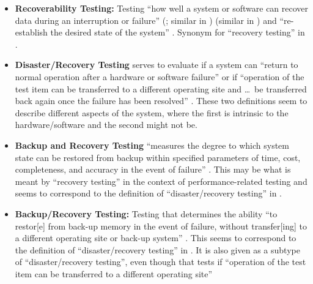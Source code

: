 \begin{itemize}
    \item \textbf{Recoverability Testing:} Testing ``how well a system or
          software can recover data during an interruption or failure''
          \ifnotpaper
              (\citealp[p.~7-10]{SWEBOK2024}; similar in \citealp{ISO_IEC2023a})
          \else
              \cite[p.~7-10]{SWEBOK2024} (similar in \cite{ISO_IEC2023a})
          \fi
          and ``re-establish the desired state of the system'' \citep{ISO_IEC2023a}.
          Synonym for ``recovery testing'' in \citet[p.~47]{Kam2008}.
    \item \textbf{Disaster/Recovery Testing} serves to evaluate if a system
          can ``return to normal operation after a hardware
          or software failure'' \citep[p.~140]{IEEE2017} or if ``operation of
          the test item can be transferred to a different operating site and
          \dots\ be transferred back again once the failure has been
          resolved'' \citeyearpar[p.~37]{IEEE2021}. These two definitions seem to
          describe different aspects of the system, where the first is
          intrinsic to the hardware/software and the second might not be.
    \item \textbf{Backup and Recovery Testing} ``measures the
          degree to which system state can be restored from backup within
          specified parameters of time, cost, completeness, and accuracy in
          the event of failure'' \citep[p.~2]{IEEE2013}. This may be what is
          meant by ``recovery testing'' in the context of performance-related
          testing and seems to correspond to the definition of
          ``disaster/recovery testing'' in \citeyearpar[p.~140]{IEEE2017}.
    \item \textbf{Backup/Recovery Testing:} Testing that determines the
          ability ``to restor[e] from back-up memory in the event of failure,
          without transfer[ing] to a different operating site or back-up
          system'' \citep[p.~37]{IEEE2021}. This seems to correspond to the
          definition of ``disaster/recovery testing'' in
          \citeyearpar[p.~37]{IEEE2021}. It is also given as a subtype of
          ``disaster/recovery testing'', even though that tests if ``operation
          of the test item can be transferred to a different operating site''

\end{itemize}
